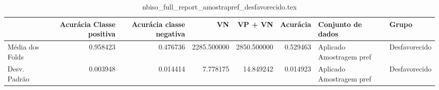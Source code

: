 \begin{table}
\centering
\caption{nbiso_full_report_amostrapref_desfavorecido.tex}
\label{nbiso_full_report_amostrapref_desfavorecido.tex}
\begin{tabular}{lrrrrrll}
\toprule
{}              &  Acurácia Classe positiva &  Acurácia classe negativa &          VN  &     VP + VN  &  Acurácia &         Conjunto de dados &          Grupo \\
\midrule
Média dos Folds &                  0.958423 &                  0.476736 &  2285.500000 &  2850.500000 &  0.529463 &  Aplicado Amostragem pref &  Desfavorecido \\
Desv. Padrão    &                  0.003948 &                  0.014414 &     7.778175 &    14.849242 &  0.014923 &  Aplicado Amostragem pref &  Desfavorecido \\
\bottomrule
\end{tabular}
\end{table}
